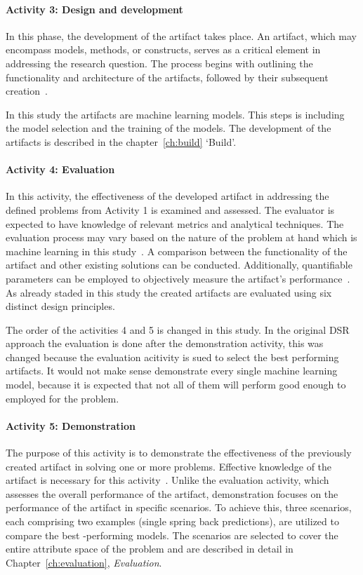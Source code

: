 \paragraph{Activity 3: Design and development}
In this phase, the development of the artifact takes place.
An artifact, which may encompass models, methods, or constructs, serves as a critical element in addressing the
research question.
The process begins with outlining the functionality and architecture of the artifacts, followed by their subsequent
creation~\cite[p. 55]{peffers_designscienceresearch_2007}.

In this study the artifacts are machine learning models.
This steps is including the model selection and the training of the models.
The development of the artifacts is described in the chapter~\ref{ch:build} `Build'.

\paragraph{Activity 4: Evaluation}
In this activity, the effectiveness of the developed artifact in addressing the defined problems from Activity 1 is
examined and assessed.
The evaluator is expected to have knowledge of relevant metrics and analytical techniques.
The evaluation process may vary based on the nature of the problem at hand which is machine learning in this
study~\cite[p. 56]{peffers_designscienceresearch_2007}.
A comparison between the functionality of the artifact and other existing solutions can be conducted.
Additionally, quantifiable parameters can be employed to objectively measure the artifact's
performance~\cite[p. 56]{peffers_designscienceresearch_2007}.
As already staded in this study the created artifacts are evaluated using six distinct design principles.

The order of the activities 4 and 5 is changed in this study.
In the original DSR approach the evaluation is done after the demonstration activity, this was changed because the
evaluation acitivity is sued to select the best performing artifacts.
It would not make sense demonstrate every single machine learning model, because it is expected that not all of them
will perform good enough to employed for the problem.

\paragraph{Activity 5: Demonstration}
The purpose of this activity is to demonstrate the effectiveness of the previously created artifact in solving one or
more problems.
Effective knowledge of the artifact is necessary for this
activity~\cite[p. 55]{peffers_designscienceresearch_2007}.
Unlike the evaluation activity, which assesses the overall performance of the artifact, demonstration focuses on the
performance of the artifact in specific scenarios. To achieve this, three
scenarios, each comprising two examples (single spring back predictions), are utilized to compare the best
-performing models.
The scenarios are selected to cover the entire attribute space of the problem and are described in detail in
Chapter~\ref{ch:evaluation}, \textit{Evaluation}.

